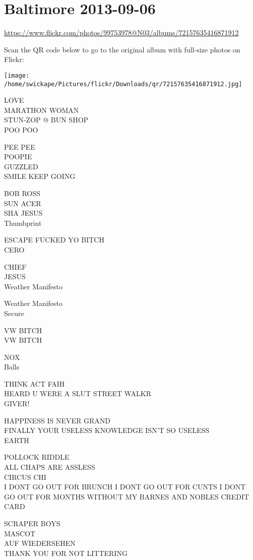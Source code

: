 \documentclass[10pt,letterpaper]{article}
\begin{document}
\section*{Baltimore 2013-09-06}

\url{https://www.flickr.com/photos/99753978@N03/albums/72157635416871912}

Scan the QR code below to go to the original album with full-size photos on Flickr:

\texttt{[image: /home/swickape/Pictures/flickr/Downloads/qr/72157635416871912.jpg]}


LOVE\\
MARATHON WOMAN\\
STUN{-}ZOP @ BUN SHOP\\
POO POO

PEE PEE\\
POOPIE\\
GUZZLED\\
SMILE KEEP GOING

BOB ROSS\\
SUN ACER\\
SHA JESUS\\
Thumbprint

ESCAPE FUCKED YO BITCH\\
CERO

CHIEF\\
JESUS\\
Weather Manifesto

Weather Manifesto\\
Secure

VW BITCH\\
VW BITCH

NOX\\
Balls

THINK ACT FAIH\\
HEARD U WERE A SLUT STREET WALKR\\
GIVER!

HAPPINESS IS NEVER GRAND\\
FINALLY YOUR USELESS KNOWLEDGE ISN'T SO USELESS\\
EARTH

POLLOCK RIDDLE\\
ALL CHAPS ARE ASSLESS\\
CIRCUS CHI\\
I DONT GO OUT FOR BRUNCH I DONT GO OUT FOR CUNTS I DONT GO OUT FOR MONTHS WITHOUT MY BARNES AND NOBLES CREDIT CARD

SCRAPER BOYS\\
MASCOT\\
AUF WIEDERSEHEN\\
THANK YOU FOR NOT LITTERING
\end{document}
